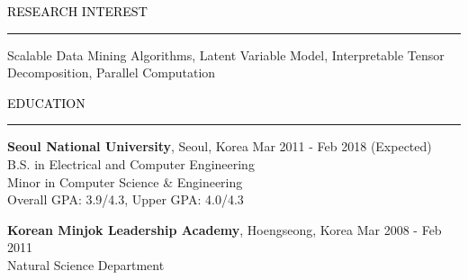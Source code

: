 \documentclass{resume} %
\renewenvironment{rSection}[1]{
	\sectionskip
	\textcolor{Black}{\MakeUppercase{#1}}
	\sectionlineskip
	\hrule
	\begin{list}{}{
			\setlength{\leftmargin}{1.5em}
		}
		\item[]
	}{
	\end{list}
}
\begin{document}
	
	
	\begin{rSection}{Research Interest}
		Scalable Data Mining Algorithms, Latent Variable Model, Interpretable Tensor Decomposition, Parallel Computation\hfill
		\vspace{-3mm}
	\end{rSection}
	
	
	\begin{rSection}{Education}		
		{\bf Seoul National University}, Seoul, Korea \hfill { Mar 2011 - Feb 2018 (Expected)} 
		\\ B.S. in Electrical and Computer Engineering\hfill
		\\ Minor in Computer Science \& Engineering \hfill
		\\ Overall GPA: 3.9/4.3, Upper GPA: 4.0/4.3
		
		{\bf Korean Minjok Leadership Academy}, Hoengseong, Korea \hfill { Mar 2008 - Feb 2011} 
		\\ Natural Science Department \hfill
				
	\end{rSection}

\end{document}
